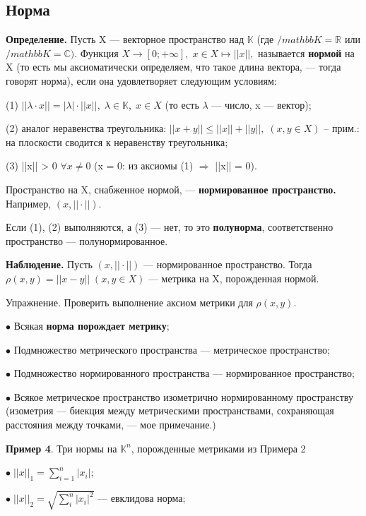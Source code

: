 \documentclass[12pt,a4paper]{article}
\begin{document}
\subsection{Норма}

\textbf{Определение.} Пусть X --- векторное пространство над $\mathbb{K}$ (где $/mathbb{K} = \mathbb{R}$ или $/mathbb{K} = \mathbb{C}).$ Функция $X \to [0; +\infty], \; x \in X \mapsto ||x||,$ называется \textbf{нормой} на X (то есть мы аксиоматически определяем, что такое длина вектора, --- тогда говорят норма), если она удовлетворяет следующим условиям: 

(1) $||\lambda \cdot x|| = |\lambda| \cdot ||x||, \; \lambda \in \mathbb{K}, \; x \in X$ (то есть $\lambda$ --- число, x --- вектор);

(2) аналог неравенства треугольника: $||x + y|| \leqslant ||x|| + ||y||, \; (x, y \in X)$ -- прим.: на плоскости сводится к неравенству треугольника; 

(3) ||x|| > 0 $\forall x \neq 0$ (x = 0: из аксиомы (1) $\Rightarrow$ ||x|| = 0). 

Пространство на X, снабженное нормой, --- \textbf{нормированное пространство.} Например, $(x, ||\cdot||).$

Если (1), (2) выполняются, а (3) --- нет, то это \textbf{полунорма}, соответственно пространство --- полунормированное. 

\textbf{Наблюдение.} Пусть $(x, ||\cdot||)$ --- нормированное пространство. Тогда $\rho(x, y) = ||x - y|| \; (x, y \in X)$ --- метрика на X, порожденная нормой.  

Упражнение. Проверить выполнение аксиом метрики для $\rho(x, y).$ 

$\bullet$ Всякая \textbf{норма порождает метрику}; 

$\bullet$ Подмножество метрического пространства --- метрическое пространство; 

$\bullet$ Подмножество нормированного пространства --- нормированное пространство;  

$\bullet$ Всякое метрическое пространство изометрично нормированному пространству (изометрия --- биекция между метрическими пространствами, сохраняющая расстояния между точками, --- мое примечание.)

\textbf{Пример 4}. Три нормы на $\mathbb{K}^{n}$, порожденные метриками из Примера 2

$\bullet \; ||x||_{1} = \sum_{i = 1}^{n} |x_i|;$

$\bullet \; ||x||_{2} = \sqrt{\sum_{i}^{n} |x_{i}|^2}$ --- евклидова норма; 
\end{document}

